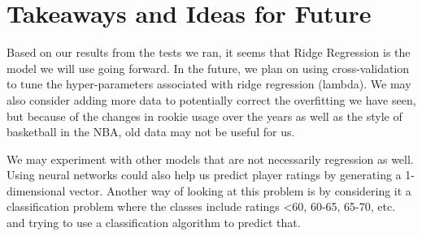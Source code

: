 \documentclass{article}
\begin{document}
\section{Takeaways and Ideas for Future}
Based on our results from the tests we ran, it seems that Ridge Regression is the model we will use going forward. In the future, we plan on using cross-validation to tune the hyper-parameters associated with ridge regression (lambda). We may also consider adding more data to potentially correct the overfitting we have seen, but because of the changes in rookie usage over the years as well as the style of basketball in the NBA, old data may not be useful for us.

We may experiment with other models that are not necessarily regression as well. Using neural networks could also help us predict player ratings by generating a 1-dimensional vector. Another way of looking at this problem is by considering it a classification problem where the classes include ratings \textless60, 60-65, 65-70, etc. and trying to use a classification algorithm to predict that.
\end{document}

